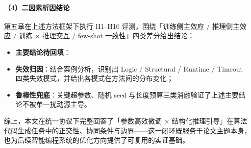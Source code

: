 \paragraph{（4）二因素析因结论}
第五章在上述方法框架下执行 H1--H10 评测，围绕「训练侧主效应 / 推理侧主效应 / 训练 $\times$ 推理交互 / few-shot 一致性」四类差分给出结论：
\begin{itemize}
    \item \textbf{主要结论待回填}：%
    \item \textbf{失效归因}：结合案例分析，识别出 Logic / Structural / Runtime / Timeout 四类失效模式，并给出各模式在方法间的分布变化；
    \item \textbf{鲁棒性兜底}：关键超参数、随机 seed 与长度预算三类消融验证了上述主要结论不被单一扰动源主导。
\end{itemize}
综上，本文在统一协议下完整回答了「参数高效微调 $\times$ 结构化推理引导」在算法代码生成任务中的正交性、协同条件与边界——这一闭环既服务于论文主题本身，也为后续智能编程系统的优化方向提供了可复用的实证基础。
